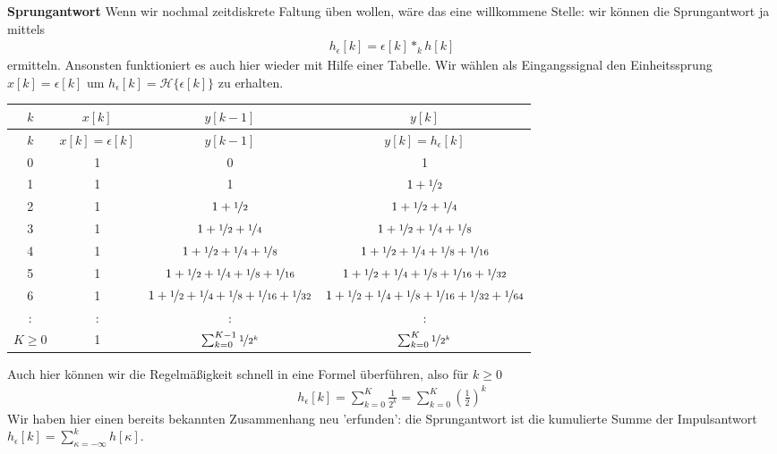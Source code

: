 \begin{Ansatz}
\textbf{Sprungantwort}
Wenn wir nochmal zeitdiskrete Faltung üben wollen, wäre das eine willkommene
Stelle: wir können die Sprungantwort ja mittels
\begin{align}
h_\epsilon[k] = \epsilon[k] \ast_k h[k]
\end{align}
ermitteln.
Ansonsten funktioniert es auch hier wieder mit Hilfe einer
Tabelle. Wir wählen als Eingangssignal den Einheitssprung $x[k]=\epsilon[k]$
um $h_\epsilon[k] = \mathcal{H}\{\epsilon[k]\}$ zu erhalten.
%
\begin{center}
\begin{tabular}{||c | c | c | c||}
\hline
$k$ & $x[k]$ & $y[k-1]$ & $y[k]$ \\
\hline\hline
$k$ & $x[k]=\epsilon[k]$ & $y[k-1]$ & $y[k] = h_\epsilon[k]$ \\
\hline
0 & 1 & 0 & 1  \\\hline
1 & 1 & 1  & $1+\nicefrac{1}{2}$ \\\hline
2 & 1 & $1+\nicefrac{1}{2}$ & $1+\nicefrac{1}{2}+\nicefrac{1}{4}$ \\\hline
3 & 1 & $1+\nicefrac{1}{2}+\nicefrac{1}{4}$ & $1+\nicefrac{1}{2}+\nicefrac{1}{4}+\nicefrac{1}{8}$ \\\hline
4 & 1 & $1+\nicefrac{1}{2}+\nicefrac{1}{4}+\nicefrac{1}{8}$ & $1+\nicefrac{1}{2}+\nicefrac{1}{4}+\nicefrac{1}{8}+\nicefrac{1}{16}$ \\\hline
5 & 1 & $1+\nicefrac{1}{2}+\nicefrac{1}{4}+\nicefrac{1}{8}+\nicefrac{1}{16}$ & $1+\nicefrac{1}{2}+\nicefrac{1}{4}+\nicefrac{1}{8}+\nicefrac{1}{16}+\nicefrac{1}{32}$ \\\hline
6 & 1 & $1+\nicefrac{1}{2}+\nicefrac{1}{4}+\nicefrac{1}{8}+\nicefrac{1}{16}+\nicefrac{1}{32}$ & $1+\nicefrac{1}{2}+\nicefrac{1}{4}+\nicefrac{1}{8}+\nicefrac{1}{16}+\nicefrac{1}{32}+\nicefrac{1}{64}$ \\\hline
: & : & : & : \\\hline
$K \geq 0$ & 1 & $\sum_{k=0}^{K-1} \nicefrac{1}{2^k}$ & $\sum_{k=0}^K \nicefrac{1}{2^k}$ \\\hline
\end{tabular}
\end{center}
Auch hier können wir die Regelmäßigkeit schnell in eine Formel überführen, also für $k\geq 0$
\begin{align}
h_\epsilon[k] = \sum_{k=0}^K \frac{1}{2^k} = \sum_{k=0}^K (\frac{1}{2})^k
\end{align}
Wir haben hier einen bereits bekannten Zusammenhang neu 'erfunden': die Sprungantwort
ist die kumulierte Summe der Impulsantwort
$h_\epsilon[k] = \sum_{\kappa=-\infty}^{k} h[\kappa]$.


\end{Ansatz}
